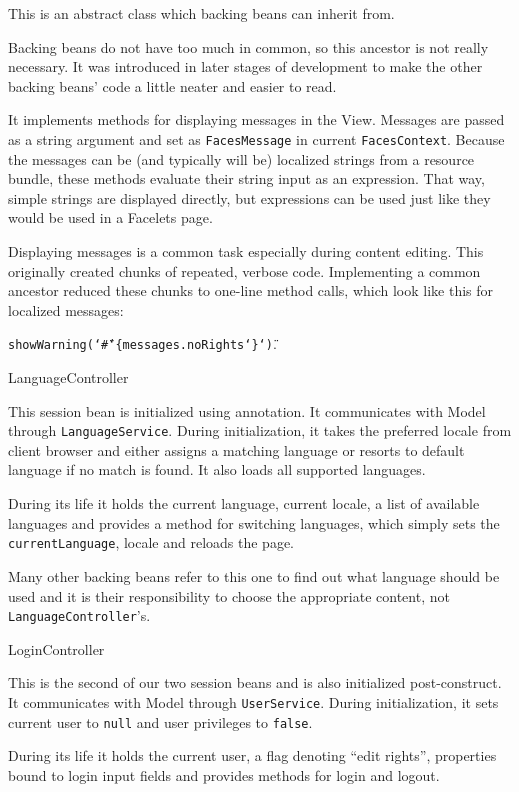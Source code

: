 This is an abstract class which backing beans can inherit from.

Backing beans do not have too much in common, so this ancestor is not really necessary. It was introduced in later stages of development to make the other backing beans’ code a little neater and easier to read.

It implements methods for displaying messages in the View. Messages are passed as a string argument and set as {\tt FacesMessage} in current {\tt FacesContext}. Because the messages can be (and typically will be) localized strings from a resource bundle, these methods evaluate their string input as an  expression. That way, simple strings are displayed directly, but  expressions can be used just like they would be used in a Facelets page.

Displaying messages is a common task especially during content editing. This originally created chunks of repeated, verbose code. Implementing a common ancestor reduced these chunks to one-line method calls, which look like this for localized messages:

 {\tt showWarning(\char`\"\#\char`\{messages.noRights\char`\}\char`\")}.

\secc LanguageController

This session bean is initialized using {\tt@PostConstruct} annotation. It communicates with Model through {\tt LanguageService}. During initialization, it takes the preferred locale from client browser and either assigns a matching language or resorts to default language if no match is found. It also loads all supported languages.

During its life it holds the current language, current locale, a list of available languages and provides a method for switching languages, which simply sets the {\tt currentLanguage}, locale and reloads the page.

Many other backing beans refer to this one to find out what language should be used and it is their responsibility to choose the appropriate content, not {\tt LanguageController}’s.

\secc LoginController

This is the second of our two session beans and is also initialized post-construct. It communicates with Model through {\tt UserService}. During initialization, it sets current user to {\tt null} and user privileges to {\tt false}.

During its life it holds the current user, a flag denoting “edit rights”, properties bound to login input fields and provides methods for login and logout.

